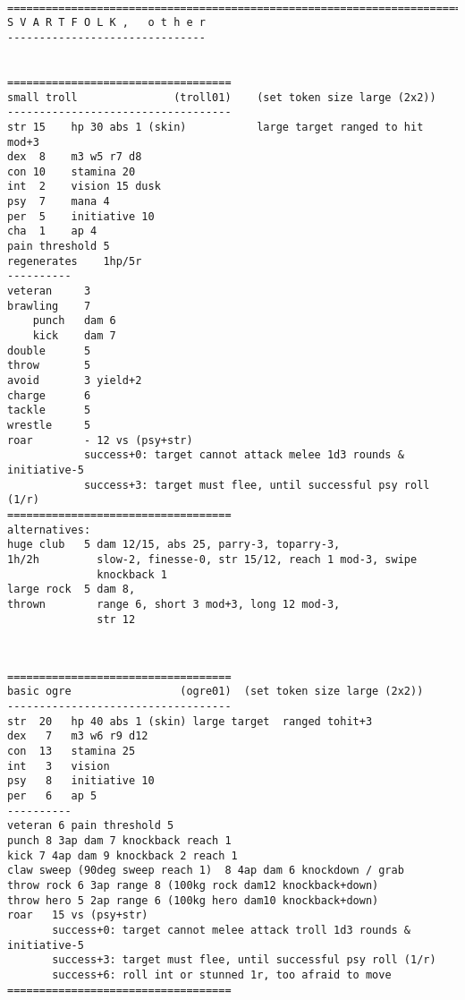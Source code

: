 \





\clearpage
{}


\goodbreak \begin{samepage} \small \begin{verbatim}
================================================================================
S V A R T F O L K ,   o t h e r
-------------------------------


===================================
small troll               (troll01)    (set token size large (2x2))
-----------------------------------
str 15    hp 30 abs 1 (skin)           large target ranged to hit mod+3
dex  8    m3 w5 r7 d8
con 10    stamina 20
int  2    vision 15 dusk
psy  7    mana 4
per  5    initiative 10
cha  1    ap 4
pain threshold 5
regenerates    1hp/5r
----------
veteran     3
brawling    7
    punch   dam 6
    kick    dam 7
double      5
throw       5
avoid       3 yield+2
charge      6
tackle      5
wrestle     5
roar        - 12 vs (psy+str)
            success+0: target cannot attack melee 1d3 rounds & initiative-5
            success+3: target must flee, until successful psy roll (1/r)
===================================
alternatives:
huge club   5 dam 12/15, abs 25, parry-3, toparry-3,
1h/2h         slow-2, finesse-0, str 15/12, reach 1 mod-3, swipe
              knockback 1
large rock  5 dam 8,
thrown        range 6, short 3 mod+3, long 12 mod-3,
              str 12
\end{verbatim} \normalsize \end{samepage}

\

\goodbreak \begin{samepage} \small \begin{verbatim}
===================================
basic ogre                 (ogre01)  (set token size large (2x2))
-----------------------------------
str  20   hp 40 abs 1 (skin) large target  ranged tohit+3
dex   7   m3 w6 r9 d12
con  13   stamina 25
int   3   vision
psy   8   initiative 10
per   6   ap 5
----------
veteran 6 pain threshold 5
punch 8 3ap dam 7 knockback reach 1
kick 7 4ap dam 9 knockback 2 reach 1
claw sweep (90deg sweep reach 1)  8 4ap dam 6 knockdown / grab
throw rock 6 3ap range 8 (100kg rock dam12 knockback+down)
throw hero 5 2ap range 6 (100kg hero dam10 knockback+down)
roar   15 vs (psy+str)
       success+0: target cannot melee attack troll 1d3 rounds & initiative-5
       success+3: target must flee, until successful psy roll (1/r)
       success+6: roll int or stunned 1r, too afraid to move
===================================
\end{verbatim} \normalsize \end{samepage}

